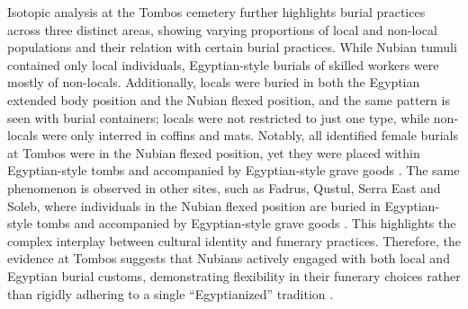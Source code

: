Isotopic analysis at the Tombos cemetery further highlights burial practices across three distinct areas, showing varying proportions of local and non-local populations and their relation with certain burial practices. While Nubian tumuli contained only local individuals, Egyptian-style burials of skilled workers were mostly of non-locals. Additionally, locals were buried in both the Egyptian extended body position and the Nubian flexed position, and the same pattern is seen with burial containers; locals were not restricted to just one type, while non-locals were only interred in coffins and mats. Notably, all identified female burials at Tombos were in the Nubian flexed position, yet they were placed within Egyptian-style tombs and accompanied by Egyptian-style grave goods \parencites[p.~291-292]{buzonEntanglementFormationAncient2016}[p.~207]{smithFortifiedSettlementTombos2018}{schraderIntraregional87Sr86Sr2019} [p.~102]{smithCrossCulturalInteractionAncient2018} [p.~12-16]{buzonExploringIntersectionalIdentities2024}. The same phenomenon is observed in other sites, such as Fadrus, Qustul, Serra East and Soleb, where individuals in the Nubian flexed position are buried in Egyptian-style tombs and accompanied by Egyptian-style grave goods \parencites{schiffgiorginiSolebIINecropoles1972}{save-soderberghNewKingdomPharaonic1991}\parencite{williamsExcavationsAbuSimbel1992, williamsExcavationsSerraEast1993}. This highlights the complex interplay between cultural identity and funerary practices. Therefore, the evidence at Tombos suggests that Nubians actively engaged with both local and Egyptian burial customs, demonstrating flexibility in their funerary choices rather than rigidly adhering to a single “Egyptianized” tradition \parencite[p.~6]{buzonStrontiumIsotope87Sr2013}.

